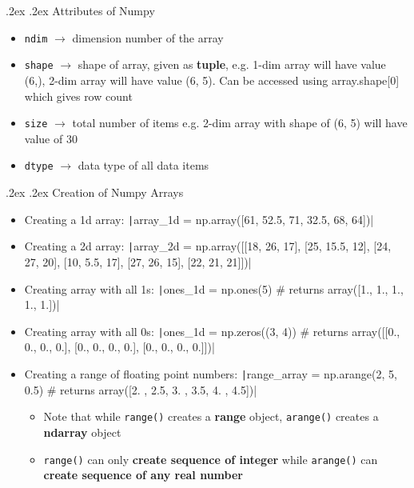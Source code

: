 \documentclass[10pt,landscape,a4paper]{article}
\makeatletter
\renewcommand{\subsection}{\@startsection{subsection}{1}{0mm}%
	{.2ex}%
	{.2ex}%
	{\sffamily\bfseries}}
\makeatother
\begin{document}
\begin{multicols*}{4}
		\subsection{Attributes of Numpy}
		\begin{itemize}
			\item \texttt{ndim} $\rightarrow$ dimension number of the array
			\item \texttt{shape} $\rightarrow$ shape of array, given as \textbf{tuple}, e.g. 1-dim array will have value (6,), 2-dim array will have value (6, 5). Can be accessed using array.shape[0] which gives row count
			\item \texttt{size} $\rightarrow$ total number of items e.g. 2-dim array with shape of (6, 5) will have value of 30
			\item \texttt{dtype} $\rightarrow$ data type of all data items
		\end{itemize}
		\subsection{Creation of Numpy Arrays}
		\begin{itemize}
			\item Creating a 1d array: \texttt|array_1d = np.array([61, 52.5, 71, 32.5, 68, 64])|
			\item Creating a 2d array: \texttt|array_2d = np.array([[18, 26, 17], [25, 15.5, 12], [24, 27, 20], [10, 5.5, 17], [27, 26, 15],	[22, 21, 21]])|
			\item Creating array with all 1s: \texttt|ones_1d = np.ones(5) # returns array([1., 1., 1., 1., 1.])|
			\item Creating array with all 0s: \texttt|ones_1d = np.zeros((3, 4)) # returns array([[0., 0., 0., 0.], [0., 0., 0., 0.], [0., 0., 0., 0.]])|
			\item Creating a range of floating point numbers: \texttt|range_array = np.arange(2, 5, 0.5) # returns array([2. , 2.5, 3. , 3.5, 4. , 4.5])|
			\begin{itemize}
				\item Note that while \texttt{range()} creates a \textbf{range} object, \texttt{arange()} creates a \textbf{ndarray} object
				\item \texttt{range()} can only \textbf{create sequence of integer} while \texttt{arange()} can \textbf{create sequence of any real number}
			\end{itemize}
		\end{itemize}

\end{multicols*}
\end{document}
